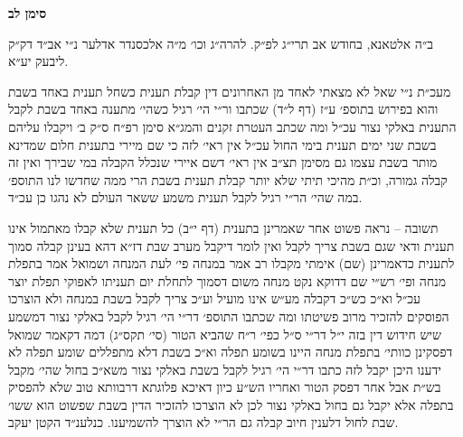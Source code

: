 \documentclass[12pt, openany]{book}
\newcommand{\chapname}{}
\newcommand{\newchap}[1]{
	\addcontentsline{toc}{chapter}{#1}
	\renewcommand{\chapname}{#1}
		\begin{center}
			\textbf{%
\fontsize{16pt}{16pt}\selectfont
				#1}
		\end{center}
}
\begin{document}
\newchap{סימן לב}
\begin{multicols}{2}
ב״ה אלטאנא, בחודש אב תרי״ג לפ״ק. להרה״ג וכו׳ מ״ה אלכסנדר אדלער נ״י אב״ד דק״ק ליבעק יע״א.\\\vspace{0pt}

מעכ״ת נ״י שאל לא מצאתי לאחד מן האחרונים דין קבלת תענית כשחל תענית באחד בשבת והוא בפירוש בתוספ׳ ע״ז (דף ל״ד) שכתבו ור״י הי׳ רגיל כשהי׳ מתענה באחד בשבת לקבל התענית באלקי נצור עכ״ל ומה שכתב העטרת זקנים והמג״א סימן רפ״ח ס״ק ב׳ ויקבלו עליהם בשבת שני ימים תענית בימי החול עכ״ל אין ראי׳ לזה כי שם מיירי בתענית חלום שמדינא מותר בשבת עצמו גם מסימן תצ״ב אין ראי׳ דשם איירי שנכלל הקבלה במי שבירך ואין זה קבלה גמורה, וכ״ת מהיכי תיתי שלא יותר קבלת תענית בשבת הרי ממה שחדשו לנו התוספ׳ במה שהי׳ הר״י רגיל לקבל תענית משמע ששאר העולם לא נהגו כן עכ״ד.\\\vspace{0pt}

תשובה – נראה פשוט אחר שאמרינן בתענית (דף י״ב) כל תענית שלא קבלו מאתמול אינו תענית ודאי שגם בשבת צריך לקבל ואין לומר דיקבל מערב שבת דז״א דהא בעינן קבלה סמוך לתענית כדאמרינן (שם) אימתי מקבלו רב אמר במנחה פי׳ לעת המנחה ושמואל אמר בתפלת מנחה ופי׳ רש״י שם דדוקא נקט מנחה משום דסמוך לתחלת יום תעניתו לאפוקי תפלת יוצר עכ״ל וא״כ כש״כ דקבלה מע״ש אינו מועיל וע״כ צריך לקבל בשבת במנחה ולא הוצרכו הפוסקים להזכיר מרוב פשיטתו ומה שכתבו התוספ׳ דר״י הי׳ רגיל לקבל באלקי נצור דמשמע שיש חידוש דין בזה י״ל דר״י ס״ל כפי׳ ר״ח שהביא הטור (סי׳ תקס״ג) דמה דקאמר שמואל דפסקינן כוותי׳ בתפלת מנחה היינו בשומע תפלה וא״כ בשבת דלא מתפללים שומע תפלה לא ידענו היכן יקבל לזה כתבו דר״י הי׳ רגיל לקבל בשבת באלקי נצור משא״כ בחול שהי׳ מקבל בש״ת אבל אחר דפסק הטור ואחריו הש״ע כיון דאיכא פלוגתא דרבוותא טוב שלא להפסיק בתפלה אלא יקבל גם בחול באלקי נצור לכן לא הוצרכו להזכיר הדין בשבת שפשוט הוא ששו׳ שבת לחול דלענין חיוב קבלה גם הר״י לא הוצרך להשמיענו. כנלענ״ד הקטן יעקב.\\\vspace{0pt}

\end{multicols}\newpage
\end{document}
